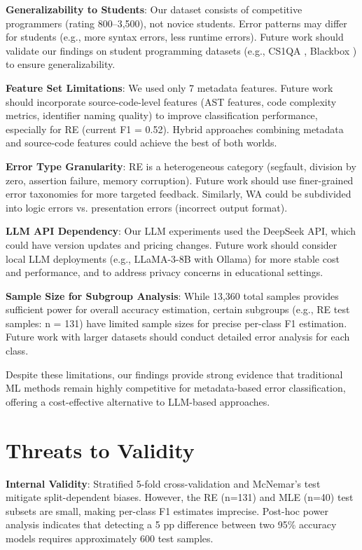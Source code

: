 \documentclass[10pt,letterpaper]{article}
\begin{document}
\textbf{Generalizability to Students}: Our dataset consists of competitive
programmers (rating 800--3,500), not novice students. Error patterns may
differ for students (e.g., more syntax errors, less runtime errors). Future
work should validate our findings on student programming datasets (e.g., CS1QA
\cite{lee2022cs1qa}, Blackbox \cite{bey2022analyzing}) to ensure generalizability.

\textbf{Feature Set Limitations}: We used only 7 metadata features. Future work
should incorporate source-code-level features (AST features, code complexity
metrics, identifier naming quality) to improve classification performance,
especially for RE (current F1 = 0.52). Hybrid approaches combining metadata
and source-code features could achieve the best of both worlds.

\textbf{Error Type Granularity}: RE is a heterogeneous category (segfault,
division by zero, assertion failure, memory corruption). Future work should
use finer-grained error taxonomies \cite{altadmri2015most} for more targeted
feedback. Similarly, WA could be subdivided into logic errors vs. presentation
errors (incorrect output format).

\textbf{LLM API Dependency}: Our LLM experiments used the DeepSeek API, which
could have version updates and pricing changes. Future work should consider local
LLM deployments (e.g., LLaMA-3-8B with Ollama) for more stable cost and
performance, and to address privacy concerns in educational settings.

\textbf{Sample Size for Subgroup Analysis}: While 13,360 total samples provides
sufficient power for overall accuracy estimation, certain subgroups (e.g., RE
test samples: n = 131) have limited sample sizes for precise per-class F1
estimation. Future work with larger datasets should conduct detailed error analysis
for each class.

Despite these limitations, our findings provide strong evidence that traditional
ML methods remain highly competitive for metadata-based error classification,
offering a cost-effective alternative to LLM-based approaches.

\section{Threats to Validity}

\textbf{Internal Validity}: Stratified 5-fold cross-validation and McNemar's test mitigate split-dependent biases. However, the RE (n=131) and MLE (n=40) test subsets are small, making per-class F1 estimates imprecise. Post-hoc power analysis indicates that detecting a 5 pp difference between two 95\% accuracy models requires approximately 600 test samples.
\end{document}
